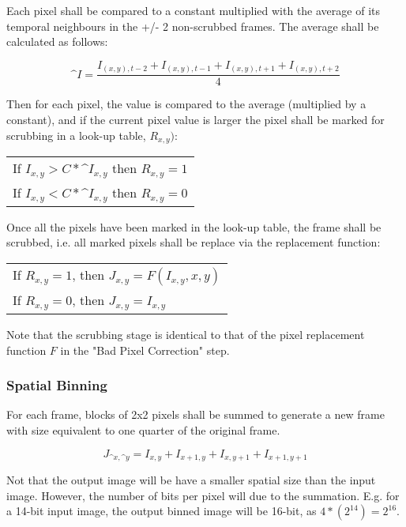 Each pixel shall be compared to a constant multiplied with the average of its temporal neighbours in the +/- 2 non-scrubbed frames. The average shall be calculated as follows:

\[\^I = \frac{I_{(x,y),t-2} + I_{(x,y),t-1} + I_{(x,y),t+1} + I_{(x,y),t+2}}{4}\]

Then for each pixel, the value is compared to the average (multiplied by a constant), and if the current pixel value is larger the pixel shall be marked for scrubbing in a look-up table, \(R_{x,y})\):

\begin{center}
\begin{tabular}{l}
If \(I_{x,y} > C*\^I_{x,y}\) then \(R_{x,y} = 1\) \\
If \(I_{x,y} < C*\^I_{x,y}\) then \(R_{x,y} = 0\) \\
\end{tabular}
\end{center}

Once all the pixels have been marked in the look-up table, the frame shall be scrubbed, i.e. all marked pixels shall be replace via the replacement function: 

\begin{center}
\begin{tabular}{l}
If \(R_{x,y} = 1\), then \(J_{x,y} = F(I_{x,y}, x, y)\) \\
If \(R_{x,y} = 0\), then \(J_{x,y} = I_{x,y}\) \\
\end{tabular}
\end{center}

Note that the scrubbing stage is identical to that of the pixel replacement function \(F\) in the "Bad Pixel Correction" step. 

\subsubsection{Spatial Binning}
For each frame, blocks of 2x2 pixels shall be summed to generate a new frame with size equivalent to one quarter of the original frame. 

\[J_{\^x, \^y} = I_{x, y} + I_{x+1, y} + I_{x, y+1} + I_{x+1, y+1}\]

Not that the output image will be have a smaller spatial size than the input image.  However, the number of bits per pixel will due to the summation. E.g. for a 14-bit input image, the output binned image will be 16-bit, as \(4 *(2^14) = 2^16\).

